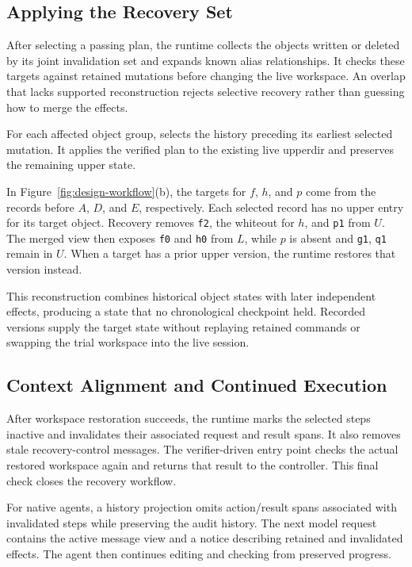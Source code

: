 \subsection{Applying the Recovery Set}

After selecting a passing plan, the runtime collects the objects written or
deleted by its joint invalidation set and expands known alias relationships.
It checks these targets against retained mutations before changing the live
workspace. An overlap that lacks supported reconstruction rejects selective
recovery rather than guessing how to merge the effects.

For each affected object group, \system selects the history preceding its
earliest selected mutation.
It applies the verified plan to the existing live upperdir and preserves the
remaining upper state.

In Figure~\ref{fig:design-workflow}(b), the targets for $f$, $h$, and $p$ come
from the records before $A$, $D$, and $E$, respectively.
Each selected record has no upper entry for its target object.
Recovery removes \texttt{f2}, the whiteout for $h$, and \texttt{p1} from $U$.
The merged view then exposes \texttt{f0} and \texttt{h0} from $L$, while $p$ is
absent and \texttt{g1}, \texttt{q1} remain in $U$.
When a target has a prior upper version, the runtime restores that version
instead.

This reconstruction combines historical object states with later independent
effects, producing a state that no chronological checkpoint held.
Recorded versions supply the target state without replaying retained commands
or swapping the trial workspace into the live session.

\subsection{Context Alignment and Continued Execution}

After workspace restoration succeeds, the runtime marks the selected steps
inactive and invalidates their associated request and result spans. It also
removes stale recovery-control messages. The verifier-driven entry point checks
the actual restored workspace again and returns that result to the controller.
This final check closes the recovery workflow.

For native agents, a history projection omits action/result spans associated
with invalidated steps while preserving the audit history.
The next model request contains the active message view and a notice describing
retained and invalidated effects.
The agent then continues editing and checking from preserved progress.

